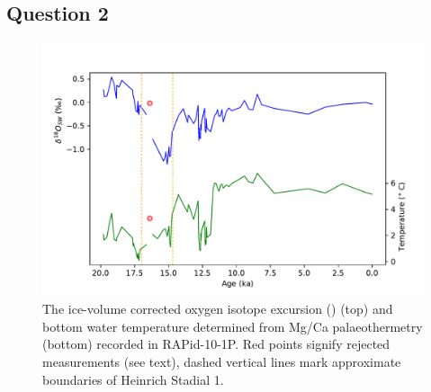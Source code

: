 \subsection{Question 2}

\begin{figure}
\includegraphics[width=\textwidth]{img/timeseries_temp_and_d18Osw.pdf}
    \caption{The ice-volume corrected oxygen isotope excursion () (top) and bottom water temperature determined from Mg/Ca palaeothermetry (bottom) recorded in RAPid-10-1P.
             Red points signify rejected measurements (see text), dashed vertical lines mark approximate boundaries of Heinrich Stadial 1.}
        \label{fig:timeseriestempd18Osw}
\end{figure}
